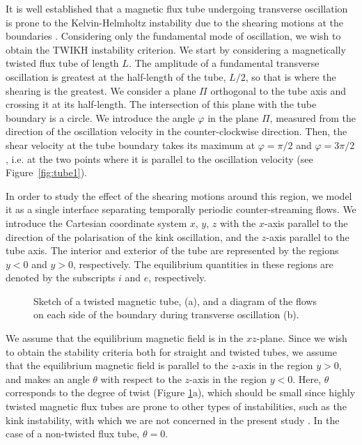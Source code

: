 It is well established that a magnetic flux tube undergoing transverse oscillation is prone to the Kelvin-Helmholtz instability due to the shearing motions at the boundaries \citep{Terradas2008}.
Considering only the fundamental mode of oscillation, we wish to obtain the TWIKH instability criterion. We start by considering a magnetically twisted flux tube of length $L$.
The amplitude of a fundamental transverse oscillation is greatest at the half-length of the tube, $L/2$, so that is where the shearing is the greatest.
We consider a plane $\Pi$ orthogonal to the tube axis and crossing it at its half-length. The intersection of this plane with the tube boundary is a circle.
We introduce the angle $\varphi$ in the plane $\Pi$, measured from the direction of the oscillation velocity in the counter-clockwise direction.
Then, the shear velocity at the tube boundary takes its maximum at $\varphi = \pi/2$ and $\varphi = 3\pi/2$\/, i.e. at the two points where it is parallel to the oscillation velocity (see Figure~\ref{fig:tube1}).

In order to study the effect of the shearing motions around this region, we model it as a single interface separating temporally periodic counter-streaming flows.
We introduce the Cartesian coordinate system $x$, $y$, $z$ with the $x$\/-axis parallel to the direction of the polarisation of the kink oscillation, and the $z$\/-axis parallel to the tube axis.
The interior and exterior of the tube are represented by the regions $y < 0$ and $y > 0$, respectively.
The equilibrium quantities in these regions are denoted by the subscripts $i$ and $e$\/, respectively.

\begin{figure}[t]
\centering
{}
\hfill
{}
\caption{Sketch of a twisted magnetic tube, (a), and a diagram of the flows on each side of the boundary during transverse oscillation (b).}
\label{fig:tube_interface}
\end{figure}

We assume that the equilibrium magnetic field is in the $xz$\/-plane.
Since we wish to obtain the stability criteria both for straight and twisted tubes, we assume that the equilibrium magnetic field is parallel to the $z$-axis in the region $y > 0$, and makes an angle $\theta$ with respect to the $z$-axis in the region $y < 0$.
Here, $\theta$ corresponds to the degree of twist (Figure \ref{fig:tube_interface}a), which should be small since highly twisted magnetic flux tubes are prone to other types of instabilities, such as the kink instability, with which we are not concerned in the present study \citep[e.g.][]{Shafranov1958, Kruskal1958, Hood1979}.
In the case of a non-twisted flux tube, $\theta = 0$.

